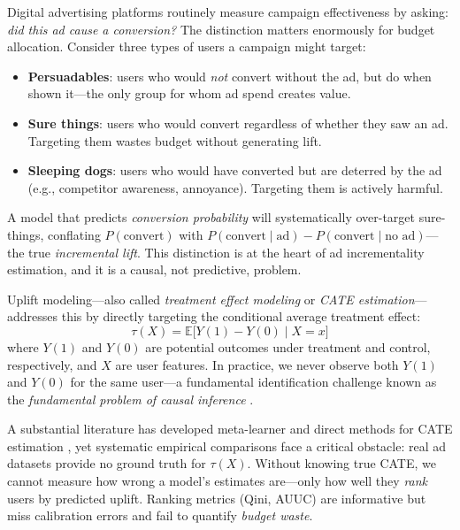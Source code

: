 \documentclass[10pt]{article}
\newcommand{\cate}{\tau(X)}
\newcommand{\Y}[1]{Y(#1)}
\newcommand{\EE}{\mathbb{E}}
\begin{document}
Digital advertising platforms routinely measure campaign effectiveness by
asking: \emph{did this ad cause a conversion?} The distinction matters
enormously for budget allocation. Consider three types of users a campaign
might target:
%
\begin{itemize}[topsep=2pt,itemsep=1pt]
  \item \textbf{Persuadables}: users who would \emph{not} convert without the
    ad, but do when shown it---the only group for whom ad spend creates value.
  \item \textbf{Sure things}: users who would convert regardless of whether
    they saw an ad. Targeting them wastes budget without generating lift.
  \item \textbf{Sleeping dogs}: users who would have converted but are deterred
    by the ad (e.g., competitor awareness, annoyance). Targeting them is
    actively harmful.
\end{itemize}
%
A model that predicts \emph{conversion probability} will systematically
over-target sure-things, conflating $P(\text{convert})$ with
$P(\text{convert} \mid \text{ad}) - P(\text{convert} \mid \text{no ad})$---the
true \emph{incremental lift}. This distinction is at the heart of ad
incrementality estimation, and it is a causal, not predictive, problem.

Uplift modeling---also called \emph{treatment effect modeling} or
\emph{CATE estimation}---addresses this by directly targeting the conditional
average treatment effect:
%
\begin{equation}
  \cate = \EE\bigl[\Y{1} - \Y{0} \;\big|\; X = x\bigr]
\end{equation}
%
where $\Y{1}$ and $\Y{0}$ are potential outcomes under treatment and control,
respectively, and $X$ are user features. In practice, we never observe both
$\Y{1}$ and $\Y{0}$ for the same user---a fundamental identification challenge
known as the \emph{fundamental problem of causal inference}
\citep{rubin1974estimating}.

A substantial literature has developed meta-learner and direct methods for
CATE estimation \citep{gutierrez2017causal,devriendt2018literature}, yet
systematic empirical comparisons face a critical obstacle: real ad datasets
provide no ground truth for $\cate$. Without knowing true CATE, we cannot
measure how wrong a model's estimates are---only how well they \emph{rank}
users by predicted uplift. Ranking metrics (Qini, AUUC) are informative but
miss calibration errors and fail to quantify \emph{budget waste}.
\end{document}
